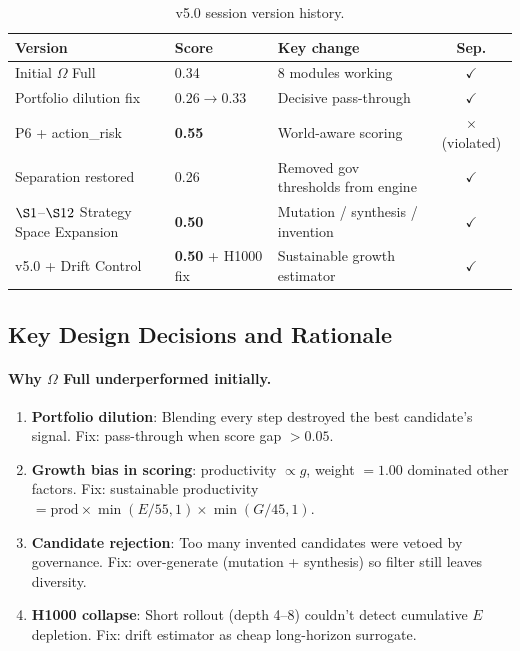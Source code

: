 \begin{table}[ht]
\centering
\small
\begin{tabularx}{\linewidth}{XlXc}
\toprule
\textbf{Version} & \textbf{Score} & \textbf{Key change} &
\textbf{Sep.} \\
\midrule
Initial $\Omega$ Full
& 0.34 & 8 modules working & $\checkmark$ \\
Portfolio dilution fix
& $0.26 \to 0.33$ & Decisive pass-through & $\checkmark$ \\
P6 + action\_risk
& \textbf{0.55} & World-aware scoring & $\times$ (violated) \\
Separation restored
& 0.26 & Removed gov thresholds from engine & $\checkmark$ \\
$\S 1$--$\S 12$ Strategy Space Expansion
& \textbf{0.50} & Mutation / synthesis / invention &
$\checkmark$ \\
v5.0 + Drift Control
& \textbf{0.50} + H1000 fix & Sustainable growth estimator &
$\checkmark$ \\
\bottomrule
\end{tabularx}
\caption[v5.0 version history]{v5.0 session version history.}
\label{tab:methodology-v50-version}
\end{table}


\subsection{Key Design Decisions and Rationale}
\label{sec:methodology-v50-rationale}

\paragraph{Why $\Omega$ Full underperformed initially.}

\begin{enumerate}
\item \textbf{Portfolio dilution}: Blending every step destroyed the
best candidate's signal. Fix: pass-through when score gap $> 0.05$.
\item \textbf{Growth bias in scoring}: productivity $\propto g$,
weight $= 1.00$ dominated other factors. Fix: sustainable
productivity $= \mathrm{prod} \times \min(E / 55, 1) \times
\min(G / 45, 1)$.
\item \textbf{Candidate rejection}: Too many invented candidates
were vetoed by governance. Fix: over-generate (mutation +
synthesis) so filter still leaves diversity.
\item \textbf{H1000 collapse}: Short rollout (depth 4--8) couldn't
detect cumulative $E$ depletion. Fix: drift estimator as cheap
long-horizon surrogate.
\end{enumerate}

